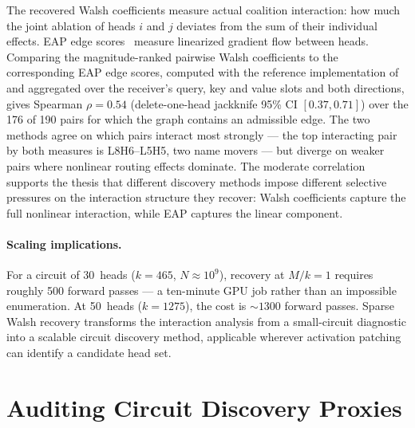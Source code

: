 \documentclass{article}
\begin{document}
The recovered Walsh coefficients measure actual coalition interaction: how
much the joint ablation of heads $i$ and $j$ deviates from the sum of their
individual effects. EAP edge scores~\citep{syed2023attribution} measure
linearized gradient flow between heads. Comparing the magnitude-ranked pairwise Walsh coefficients to the corresponding EAP edge scores, computed with the reference implementation of \citet{mueller2025mib} and aggregated over the receiver's query, key and value slots and both directions, gives Spearman $\rho = 0.54$ (delete-one-head jackknife 95\% CI $[0.37, 0.71]$) over the 176 of 190 pairs for which the graph contains an admissible edge. The two methods agree on
which pairs interact most strongly --- the top interacting pair by both
measures is L8H6--L5H5, two name movers --- but diverge on weaker pairs
where nonlinear routing effects dominate. The moderate correlation supports
the thesis that different discovery methods impose different selective
pressures on the interaction structure they recover: Walsh coefficients
capture the full nonlinear interaction, while EAP captures the linear
component.

\paragraph{Scaling implications.}

For a circuit of 30~heads ($k = 465$, $N \approx 10^9$), recovery at
$M/k = 1$ requires roughly 500 forward passes --- a ten-minute GPU job
rather than an impossible enumeration. At 50~heads ($k = 1275$), the
cost is ${\sim}1300$ forward passes. Sparse Walsh recovery transforms
the interaction analysis from a small-circuit diagnostic into a scalable
circuit discovery method, applicable wherever activation patching can
identify a candidate head set.


%
%


\section{Auditing Circuit Discovery Proxies}
\label{sec:auditing}
\end{document}

